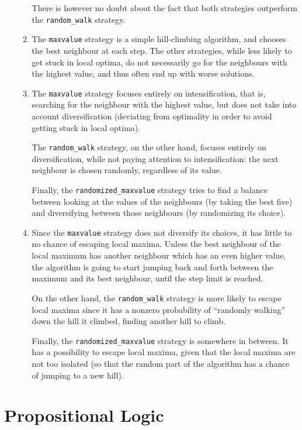 \documentclass[journal,onecolumn]{IEEEtran}
\newcommand{\py}[1]{\texttt{#1}}
\begin{document}
\begin{enumerate}
\begin{enumerate}
		There is however no doubt about the fact that both strategies outperform the \py{random_walk} strategy.
		\item The \py{maxvalue} strategy is a simple hill-climbing algorithm, and chooses the best neighbour at each step.
		The other strategies, while less likely to get stuck in local optima, do not necessarily go for the neighbours with the highest value, and thus often end up with worse solutions.
		\item The \py{maxvalue} strategy focuses entirely on intensification, that is, searching for the neighbour with the highest value, but does not take into account diversification (deviating from optimality in order to avoid getting stuck in local optima).
		
		The \py{random_walk} strategy, on the other hand, focuses entirely on diversification, while not paying attention to intensification: the next neighbour is chosen randomly, regardless of its value.
		
		Finally, the \py{randomized_maxvalue} strategy tries to find a balance between looking at the values of the neighbours (by taking the best five) and diversifying between those neighbours (by randomizing its choice).
		\item Since the \py{maxvalue} strategy does not diversify its choices, it has little to no chance of escaping local maxima.
		Unless the best neighbour of the local maximum has another neighbour which has an even higher value, the algorithm is going to start jumping back and forth between the maximum and its best neighbour, until the step limit is reached.
		
		On the other hand, the \py{random_walk} strategy is more likely to escape local maxima since it has a nonzero probability of ``randomly walking'' down the hill it climbed, finding another hill to climb.
		
		Finally, the \py{randomized_maxvalue} strategy is somewhere in between.
		It has a possibility to escape local maxima, given that the local maxima are not too isolated (so that the random part of the algorithm has a chance of jumping to a new hill).
	\end{enumerate}
\end{enumerate}

\section{Propositional Logic}
\end{document}
